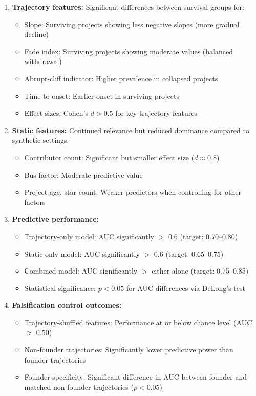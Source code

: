 \documentclass[11pt,letterpaper]{article}
\begin{document}
\begin{enumerate}
  \item \textbf{Trajectory features:} Significant differences between survival groups for:
  \begin{itemize}
    \item Slope: Surviving projects showing less negative slopes (more gradual decline)
    \item Fade index: Surviving projects showing moderate values (balanced withdrawal)
    \item Abrupt-cliff indicator: Higher prevalence in collapsed projects
    \item Time-to-onset: Earlier onset in surviving projects
    \item Effect sizes: Cohen's $d > 0.5$ for key trajectory features
  \end{itemize}
  \item \textbf{Static features:} Continued relevance but reduced dominance compared to synthetic settings:
  \begin{itemize}
    \item Contributor count: Significant but smaller effect size ($d \approx 0.8$)
    \item Bus factor: Moderate predictive value
    \item Project age, star count: Weaker predictors when controlling for other factors
  \end{itemize}
  \item \textbf{Predictive performance:}
  \begin{itemize}
    \item Trajectory-only model: AUC significantly $>$ 0.6 (target: 0.70--0.80)
    \item Static-only model: AUC significantly $>$ 0.6 (target: 0.65--0.75)
    \item Combined model: AUC significantly $>$ either alone (target: 0.75--0.85)
    \item Statistical significance: $p < 0.05$ for AUC differences via DeLong's test
  \end{itemize}
  \item \textbf{Falsification control outcomes:}
  \begin{itemize}
    \item Trajectory-shuffled features: Performance at or below chance level (AUC $\approx$ 0.50)
    \item Non-founder trajectories: Significantly lower predictive power than founder trajectories
    \item Founder-specificity: Significant difference in AUC between founder and matched non-founder trajectories ($p < 0.05$)
  \end{itemize}
\end{enumerate}
\end{document}
